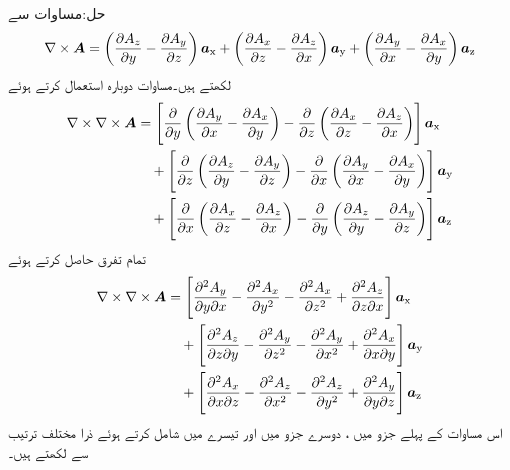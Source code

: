 حل:مساوات  سے 
\begin{align}
\nabla \times {\ensuremath{{\boldsymbol{A}}}}=\left(\frac{\partial A_z}{\partial y}-\frac{\partial A_y}{\partial z} \right){\boldsymbol{a}}_{\textup{x}}+\left( \frac{\partial A_x}{\partial z}-\frac{\partial A_z}{\partial x}\right){\boldsymbol{a}}_{\textup{y}}+\left(\frac{\partial A_y}{\partial x}-\frac{\partial A_x}{\partial y} \right){\boldsymbol{a}}_{\textup{z}}
\end{align}
لکھتے  ہیں۔مساوات  دوبارہ استعمال کرتے ہوئے 
\begin{align*}
\nabla \times \nabla \times {\ensuremath{{\boldsymbol{A}}}}&=\left[\frac{\partial}{\partial y}\left(\frac{\partial A_y}{\partial x}-\frac{\partial A_x}{\partial y} \right)-\frac{\partial}{\partial z}\left( \frac{\partial A_x}{\partial z}-\frac{\partial A_z}{\partial x}\right) \right]{\boldsymbol{a}}_{\textup{x}}\\
& \quad +\left[ \frac{\partial }{\partial z}\left(\frac{\partial A_z}{\partial y}-\frac{\partial A_y}{\partial z} \right)-\frac{\partial }{\partial x}\left(\frac{\partial A_y}{\partial x}-\frac{\partial A_x}{\partial y} \right)\right]{\boldsymbol{a}}_{\textup{y}}\\
&\quad +\left[\frac{\partial }{\partial x}\left( \frac{\partial A_x}{\partial z}-\frac{\partial A_z}{\partial x}\right)-\frac{\partial }{\partial y} \left(\frac{\partial A_z}{\partial y}-\frac{\partial A_y}{\partial z} \right)\right]{\boldsymbol{a}}_{\textup{z}}
\end{align*}
تمام تفرق حاصل کرتے ہوئے
\begin{align*}
\nabla \times \nabla \times {\ensuremath{{\boldsymbol{A}}}}&=\left[\frac{\partial^2 A_y}{\partial y\partial x}-\frac{\partial^2 A_x}{\partial y^2} -\frac{\partial^2 A_x}{\partial z^2}+\frac{\partial^2 A_z}{\partial z\partial x} \right]{\boldsymbol{a}}_{\textup{x}}\\
& \quad +\left[ \frac{\partial^2 A_z}{\partial z\partial y}-\frac{\partial^2 A_y}{\partial z^2}-\frac{\partial^2 A_y}{\partial x^2}+\frac{\partial^2 A_x}{\partial x\partial y} \right]{\boldsymbol{a}}_{\textup{y}}\\
&\quad +\left[ \frac{\partial^2 A_x}{\partial x\partial z}-\frac{\partial^2 A_z}{\partial x^2}- \frac{\partial^2 A_z}{\partial y^2}+\frac{\partial^2 A_y}{\partial y\partial z} \right]{\boldsymbol{a}}_{\textup{z}}
\end{align*}
اس مساوات کے پہلے جزو میں ، دوسرے جزو میں  اور تیسرے میں  شامل کرتے ہوئے ذرا مختلف ترتیب سے لکھتے ہیں۔
